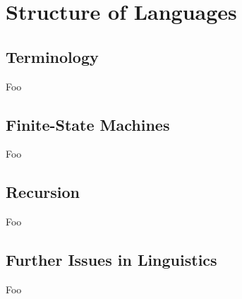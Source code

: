 \section{Structure of Languages}

\subsection{Terminology}

Foo

\subsection{Finite-State Machines}

Foo

\subsection{Recursion}

Foo

\subsection{Further Issues in Linguistics}

Foo

